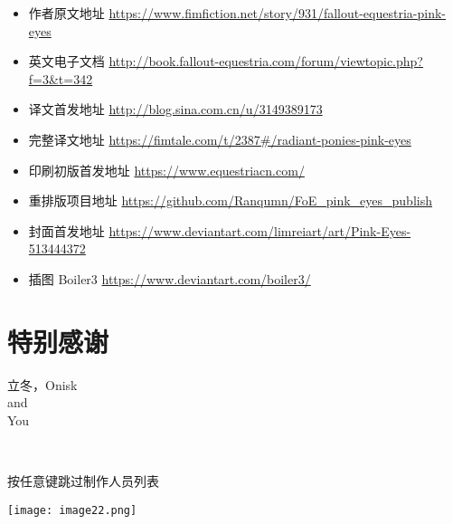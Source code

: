 \begin{itemize}
    \item 作者原文地址 \url{https://www.fimfiction.net/story/931/fallout-equestria-pink-eyes}
    \item 英文电子文档 \url{http://book.fallout-equestria.com/forum/viewtopic.php?f=3\&t=342}
    \item 译文首发地址 \url{http://blog.sina.com.cn/u/3149389173}
    \item 完整译文地址 \url{https://fimtale.com/t/2387\#/radiant-ponies-pink-eyes}
    \item 印刷初版首发地址 \url{https://www.equestriacn.com/}
    \item 重排版项目地址 \url{https://github.com/Ranqumn/FoE_pink_eyes_publish}
    \item 封面首发地址 \url{https://www.deviantart.com/limreiart/art/Pink-Eyes-513444372}
    \item 插图 Boiler3 \url{https://www.deviantart.com/boiler3/}
\end{itemize}


\section*{特别感谢}

\begin{center}
    立冬，Onisk \bigskip \\
    and \bigskip \\
    You
\end{center}



~\vfill

\begin{note}
    按任意键跳过制作人员列表
\end{note}

\texttt{[image: image22.png]}

